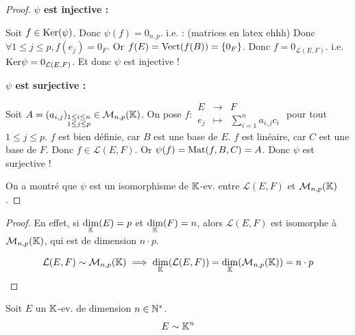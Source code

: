 \documentclass[12pt,a4paper]{report}
\begin{document}
\begin{proof}
    \textbf{$\psi$ est injective :}

    \begin{outline}
    \1 Soit $f \in \mathrm{Ker}(\psi)$. Donc $\psi(f) = 0_{n,p}$.
    \2 i.e. : (matrices en latex ehhh)
    \1 Donc $\forall 1 \le j \le p, f(e_j) = 0_F$.
    \1 Or $f(E) = \mathrm{Vect}(f(B)) = \{0_F\}$.
    \1 Donc $f = 0_{\mathcal L(E,F)}$.
    \1 i.e. $\mathrm{Ker}\psi = 0_{\mathcal L(E,F)}$.
    \1 Et donc $\psi$ est injective !
    \end{outline}

    \textbf{$\psi$ est surjective :}

    \begin{outline}
        \1 Soit $A = (a_{i,j})_{\substack{1 \le i \le n\\ 1 \le j \le p}} \in \mathcal M_{n,p}(\mathbb{K})$.
        \1 On pose $f : \begin{matrix} E &\to &F \\ e_j &\mapsto &\sum_{i=1}^n a_{i,j} c_i \end{matrix}$ pour tout $1 \le j \le p$.
        \1 $f$ est bien définie, car $B$ est une base de $E$.
        \1 $f$ est linéaire, car $C$ est une base de $F$.
        \1 Donc $f \in \mathcal L(E,F)$.
        \1 Or $\psi(f) = \mathrm{Mat}(f,B,C) = A$.
        \1 Donc $\psi$ est surjective !
    \end{outline}

    On a montré que $\psi$ est un isomorphisme de $\mathbb{K}$-ev. entre $\mathcal L(E,F)$ et $\mathcal M_{n,p}(\mathbb{K})$.
\end{proof}

\begin{proof}
    En effet, si $\underset{\mathbb{K}}\dim(E) = p$ et $\underset{\mathbb{K}}\dim(F) = n$, alors $\mathcal L(E,F)$ est isomorphe à $\mathcal M_{n,p}(\mathbb{K})$, qui est de dimension $n \cdot p$.

    $$\mathcal L(E,F) \sim \mathcal M_{n,p}(\mathbb{K}) \implies \underset{\mathbb{K}}\dim(\mathcal L(E,F)) = \underset{\mathbb{K}}\dim(\mathcal M_{n,p}(\mathbb{K})) = n \cdot p$$
\end{proof}

\begin{property}
    Soit $E$ un $\mathbb{K}$-ev. de dimension $n \in \mathbb{N}^*$.
    $$E \sim \mathbb{K}^n$$
\end{property}
\end{document}
